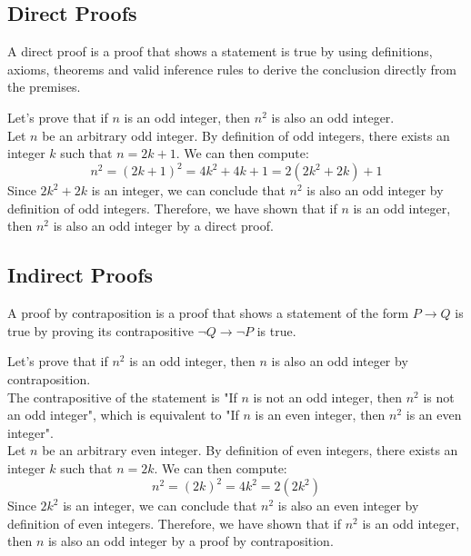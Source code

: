 \subsection{Direct Proofs}
\begin{definition}
    A direct proof is a proof that shows a statement is true by using definitions, axioms, theorems and valid inference rules to derive the conclusion directly from the premises.
\end{definition}

\begin{eg}
    Let's prove that if $n$ is an odd integer, then $n^2$ is also an odd integer. \\
    Let $n$ be an arbitrary odd integer. By definition of odd integers, there exists an integer $k$ such that $n = 2k + 1$. We can then compute:
    \[
        n^2 = (2k + 1)^2 = 4k^2 + 4k + 1 = 2(2k^2 + 2k) + 1
    \]
    Since $2k^2 + 2k$ is an integer, we can conclude that $n^2$ is also an odd integer by definition of odd integers. Therefore, we have shown that if $n$ is an odd integer, then $n^2$ is also an odd integer by a direct proof.
\end{eg}

\subsection{Indirect Proofs}
\begin{definition}
    A proof by contraposition is a proof that shows a statement of the form $P \to Q$ is true by proving its contrapositive $\neg Q \to \neg P$ is true.
\end{definition}

\begin{eg}
    Let's prove that if $n^2$ is an odd integer, then $n$ is also an odd integer by contraposition. \\
    The contrapositive of the statement is "If $n$ is not an odd integer, then $n^2$ is not an odd integer", which is equivalent to "If $n$ is an even integer, then $n^2$ is an even integer". \\
    Let $n$ be an arbitrary even integer. By definition of even integers, there exists an integer $k$ such that $n = 2k$. We can then compute:
    \[
        n^2 = (2k)^2 = 4k^2 = 2(2k^2)
    \]
    Since $2k^2$ is an integer, we can conclude that $n^2$ is also an even integer by definition of even integers. Therefore, we have shown that if $n^2$ is an odd integer, then $n$ is also an odd integer by a proof by contraposition.
\end{eg}

